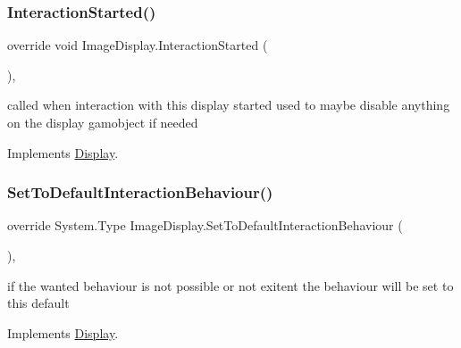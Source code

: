 \subsubsection{\texorpdfstring{Interaction\+Started()}{InteractionStarted()}}
{\footnotesize\ttfamily override void Image\+Display.\+Interaction\+Started (\begin{DoxyParamCaption}{ }\end{DoxyParamCaption})\hspace{0.3cm}{\ttfamily [protected]}, {\ttfamily [virtual]}}



called when interaction with this display started used to maybe disable anything on the display gamobject if needed 



Implements \mbox{\hyperlink{class_display_a21c51fcf185403197a78a5acfd2065de}{Display}}.

\mbox{\label{class_image_display_ae975595939d76dd1db32e6f029f53ab6}} 
\subsubsection{\texorpdfstring{Set\+To\+Default\+Interaction\+Behaviour()}{SetToDefaultInteractionBehaviour()}}
{\footnotesize\ttfamily override System.\+Type Image\+Display.\+Set\+To\+Default\+Interaction\+Behaviour (\begin{DoxyParamCaption}{ }\end{DoxyParamCaption})\hspace{0.3cm}{\ttfamily [protected]}, {\ttfamily [virtual]}}



if the wanted behaviour is not possible or not exitent the behaviour will be set to this default 



Implements \mbox{\hyperlink{class_display_a81f07350cf50b3924f4fe269e1b4cf17}{Display}}.

\mbox{\label{class_image_display_a28fead7caeeb12490d26fae943da6a1e}} 
